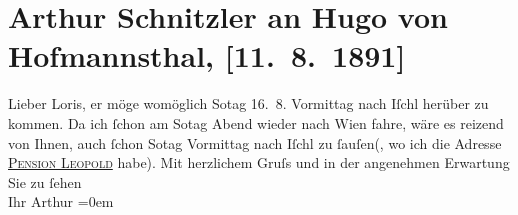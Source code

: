 

         
         \renewcommand{\erwaehntePersonen}{Personen: Richard Beer-Hofmann, Hugo von Hofmannsthal}
         \renewcommand{\erwaehnteOrte}{Orte: Bad Ischl, Hotel und Pension Rudolfshöhe (Leopold Petter), Strobl, Wien}
         \renewcommand{\erwaehnteWerke}{}
               \section[Arthur Schnitzler an Hugo von Hofmannsthal, {[}11. 8. 1891{]}]{ Arthur Schnitzler an Hugo von Hofmannsthal, {[}11. 8. 1891{]}}\nopagebreak{}\rehead{ }\begin{ledgroupsized}[t]{13cm}\normalsize\beginnumbering \toendnotes[C]{\smallbreak\pagebreak[2]} 
\toendnotes[C]{\smallbreak}\pstart
           \noindent{}{\pb}Lieber Loris\hspace*{1.5em}\label{K_L00030_1v}\label{K_L00030_1h}, er möge womöglich So{\geminationn}tag 16. 8.{ }Vormittag nach Iſchl herüber zu kommen.
               Da ich ſchon am So{\geminationn}tag{ }Abend wieder nach Wien fahre, wäre es
               reizend {\pb}von Ihnen, auch ſchon So{\geminationn}tag{ }Vormittag nach Iſchl zu ſauſen\introOben{}(\introOben{}, wo ich die Adresse \textsc{\uline{Pension Leopold}} habe\introOben{})\introOben{}.\pend
           \pstart
           Mit herzlichem Gruſs und in der angenehmen Erwartung Sie zu ſehen{\\[\baselineskip]}Ihr
                  \spacefill\mbox{Arthur}\pend
           \leftskip=0em{}
         
         \endnumbering{}\end{ledgroupsized}  \newcommand{\dateiname}{L00030}\newcommand{\titel}{Arthur Schnitzler an Hugo von Hofmannsthal, [11. 8. 1891]}\newcommand{\editorInnen}{Martin Anton Müller und Gerd-Hermann Susen}
      